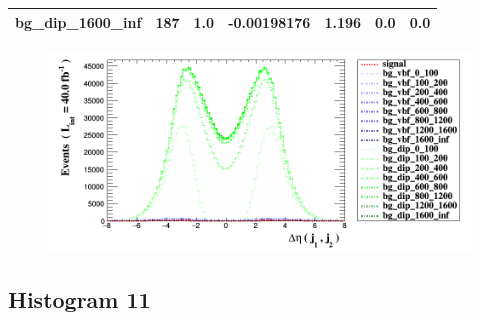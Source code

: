 \documentclass[a4paper, 10pt]{article}
\begin{document}
\begin{table}[H]
\begin{center}
\begin{tabular}{|m{23.0mm}|m{23.0mm}|m{18.0mm}|m{19.0mm}|m{19.0mm}|m{19.0mm}|m{19.0mm}|}
      \hline
      {\cellcolor{white}         bg\_dip\_1600\_inf}& {\cellcolor{white}         187}& {\cellcolor{white}         1.0}& {\cellcolor{white}         -0.00198176}& {\cellcolor{white}         1.196}& {\cellcolor{green}         0.0}& {\cellcolor{green}         0.0}\\
\hline
    \end{tabular}
  \end{center}
\end{table}

\begin{figure}[H]
  \begin{center}
    \includegraphics[scale=0.45]{selection_9.png}\\
\caption{   }
  \end{center}
\end{figure}
      \newpage
\subsection{ Histogram 11}
\end{document}
